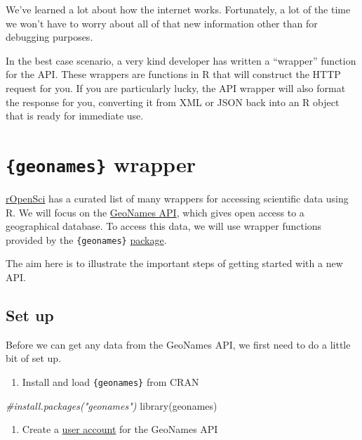 \documentclass[
  12pt,
]{book}
\newenvironment{Shaded}{\begin{snugshade}}{\end{snugshade}}
\newcommand{\CommentTok}[1]{\textcolor[rgb]{0.56,0.35,0.01}{\textit{#1}}}
\newcommand{\FunctionTok}[1]{\textcolor[rgb]{0.00,0.00,0.00}{#1}}
\newcommand{\NormalTok}[1]{#1}
\providecommand{\tightlist}{%
  \setlength{\itemsep}{0pt}\setlength{\parskip}{0pt}}
\begin{document}
We've learned a lot about how the internet works. Fortunately, a lot of the time we won't have to worry about all of that new information other than for debugging purposes.

In the best case scenario, a very kind developer has written a ``wrapper'' function for the API. These wrappers are functions in R that will construct the HTTP request for you. If you are particularly lucky, the API wrapper will also format the response for you, converting it from XML or JSON back into an R object that is ready for immediate use.

\hypertarget{geonames-wrapper}{%
\section{\texorpdfstring{\texttt{\{geonames\}} wrapper}{\{geonames\} wrapper}}\label{geonames-wrapper}}

\href{https://ropensci.org/}{rOpenSci} has a curated list of many wrappers for accessing scientific data using R. We will focus on the \href{https://www.geonames.org/}{GeoNames API}, which gives open access to a geographical database. To access this data, we will use wrapper functions provided by the \texttt{\{geonames\}} \href{https://docs.ropensci.org/geonames/}{package}.

The aim here is to illustrate the important steps of getting started with a new API.

\hypertarget{set-up}{%
\subsection{Set up}\label{set-up}}

Before we can get any data from the GeoNames API, we first need to do a little bit of set up.

\begin{enumerate}
\def\labelenumi{\arabic{enumi}.}
\tightlist
\item
  Install and load \texttt{\{geonames\}} from CRAN
\end{enumerate}

\begin{Shaded}
\begin{Highlighting}[]
\CommentTok{\#install.packages("geonames")}
\FunctionTok{library}\NormalTok{(geonames)}
\end{Highlighting}
\end{Shaded}

\begin{enumerate}
\def\labelenumi{\arabic{enumi}.}
\setcounter{enumi}{1}
\tightlist
\item
  Create a \href{https://www.geonames.org/login}{user account} for the GeoNames API
\end{enumerate}
\end{document}
